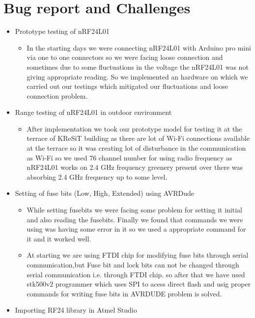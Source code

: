 \documentclass[a4paper,12pt,oneside]{book}
\begin{document}
\section{Bug report and Challenges}

\begin{itemize}
        \item Prototype testing of nRF24L01
        \begin{itemize}
        \item In the starting days we were connecting nRF24L01 with Arduino pro mini via one to one connectors so we were facing loose connection and sometimes due to some fluctuations in the voltage the nRF24L01 was not giving appropriate reading. So we implemented an hardware on which we carried out our testings which mitigated our fluctuations and loose connection problem.
        \end{itemize}
        \item Range testing of nRF24L01 in outdoor environment
        \begin{itemize}
        \item After implementation we took our prototype model for testing it at the terrace of KReSiT building as there are lot of Wi-Fi connections available at the terrace so it was creating lot of disturbance in the communication as Wi-Fi so we used 76 channel number for  using radio frequency as nRF24L01 works on 2.4 GHz frequency greenery present over there was absorbing 2.4 GHz frequency up to some level.
        \end{itemize}
        \item Setting of fuse bits (Low, High, Extended) using AVRDude
        \begin{itemize}
        \item While setting fusebits we were facing some problem for setting it initial and also reading the fusebits. Finally we found that commands we were using was having some error  in it so we used  a appropriate command for it and it worked well.
        \item At starting we are using FTDI chip for modifying fuse bits through serial communication,but  Fuse bit and lock bits can not be changed through serial communication i.e. through FTDI chip. so after that we have used stk500v2 programmer which uses SPI to acess direct flash and usig proper commands for writing fuse bits in AVRDUDE problem is solved.
        \end{itemize}
        \item Importing RF24 library in Atmel Studio

\end{itemize}
\end{document}

